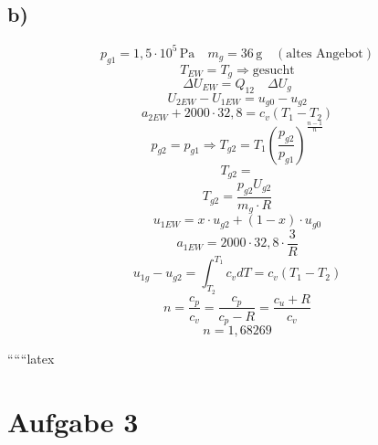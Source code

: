 

\subsection*{b)}
\[
p_{g1} = 1{,}5 \cdot 10^5 \, \text{Pa} \quad m_g = 36 \, \text{g} \quad (\text{altes Angebot})
\]
\[
T_{EW} = T_g \Rightarrow \text{gesucht}
\]
\[
\Delta U_{EW} = Q_{12} \quad \Delta U_g
\]
\[
U_{2EW} - U_{1EW} = u_{g0} - u_{g2}
\]
\[
a_{2EW} + 2000 \cdot 32{,}8 = c_v (T_1 - T_2)
\]
\[
p_{g2} = p_{g1} \Rightarrow T_{g2} = T_1 \left( \frac{p_{g2}}{p_{g1}} \right)^{\frac{n-1}{n}}
\]
\[
T_{g2} =
\]
\[
T_{g2} = \frac{p_{g2} U_{g2}}{m_g \cdot R}
\]
\[
u_{1EW} = x \cdot u_{g2} + (1-x) \cdot u_{g0}
\]
\[
a_{1EW} = 2000 \cdot 32{,}8 \cdot \frac{3}{R}
\]
\[
u_{1g} - u_{g2} = \int_{T_2}^{T_1} c_v dT = c_v (T_1 - T_2)
\]
\[
n = \frac{c_p}{c_v} = \frac{c_p}{c_p - R} = \frac{c_u + R}{c_v}
\]
\[
n = 1{,}68269
\]

``````latex


\section*{Aufgabe 3}